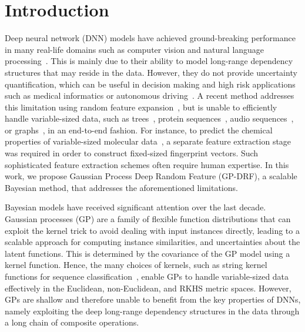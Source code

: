 \documentclass[conference]{IEEEtran}
\begin{document}
\section{Introduction}



Deep neural network (DNN) models have achieved ground-breaking performance in many real-life domains such as computer vision and natural language processing~\cite{goodfellow2016deep}. This is mainly due to their ability to model long-range dependency structures that may reside in the data. However, they do not provide uncertainty quantification, which can be useful in decision making and high risk applications such as medical informatics or autonomous driving~\cite{gal2016uncertainty}. A recent method addresses this limitation using random feature expansion~\cite{rfdnn17}, but is unable to efficiently handle variable-sized data, such as trees~\cite{moschitti2006making}, protein sequences~\cite{lo2000scop}, audio sequences~\cite{kuksa2008kernel}, or graphs~\cite{vishwanathan2010graph}, in an end-to-end fashion. For instance, to predict the chemical properties of variable-sized molecular data~\cite{DuvMacetal15nfp}, a separate feature extraction stage was required in order to construct fixed-sized fingerprint vectors. Such sophisticated feature extraction schemes often require human expertise. In this work, we propose Gaussian Process Deep Random Feature (GP-DRF), a scalable Bayesian method, that addresses the aforementioned limitations.



Bayesian models have received significant attention over the last decade. Gaussian processes (GP) are a family of flexible function distributions that can exploit the kernel trick to avoid dealing with input instances directly, leading to a scalable approach for computing instance similarities, and uncertainties about the latent functions. This is determined by the covariance of the GP model using a kernel function. Hence, the many choices of kernels, such as string kernel functions for sequence classification~\cite{farhan2017efficient}, enable GPs to handle variable-sized data effectively in the Euclidean, non-Euclidean, and RKHS metric spaces. However, GPs are shallow and therefore  unable to benefit from the key properties of DNNs, namely exploiting the deep long-range dependency structures in the data through a long chain of composite operations. 
\end{document}
